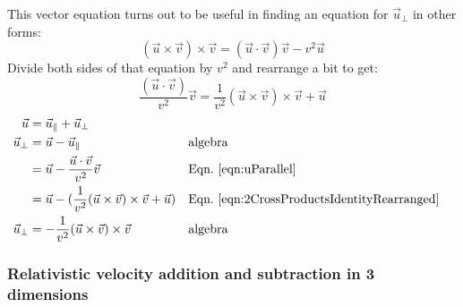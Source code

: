 \documentclass[a4paper]{article}
\theoremstyle{plain}
\theoremstyle{definition}
\newcommand{\vect}[1]{\vec{#1}}
\begin{document}
This vector equation turns out to be useful in finding an equation for
$\vect{u}_{\perp}$ in other forms:
\begin{equation}
(\vect{u} \times \vect{v}) \times \vect{v} = (\vect{u} \cdot \vect{v}) \vect{v} - v^2 \vect{u} \label{eqn:2CrossProductsIdentity}
\end{equation}
Divide both sides of that equation by $v^2$ and rearrange a bit to get:
\begin{equation}
\frac{(\vect{u} \cdot \vect{v})}{v^2} \vect{v} = \frac{1}{v^2} (\vect{u} \times \vect{v}) \times \vect{v} + \vect{u} \label{eqn:2CrossProductsIdentityRearranged}
\end{equation}
\begin{align}
\vect{u} & = \vect{u}_{\parallel} + \vect{u}_{\perp} \nonumber \\
\vect{u}_{\perp}
  & = \vect{u} - \vect{u}_{\parallel} & & \text{algebra} \nonumber \\
  & = \vect{u} - \frac{\vect{u} \cdot \vect{v}}{v^2} \vect{v} & & \text{Eqn.~\eqref{eqn:uParallel}} \nonumber \\
  & = \vect{u} - (\frac{1}{v^2} (\vect{u} \times \vect{v}) \times \vect{v} + \vect{u}) & & \text{Eqn.~\eqref{eqn:2CrossProductsIdentityRearranged}} \nonumber \\\vect{u}_{\perp}
  & = - \frac{1}{v^2} (\vect{u} \times \vect{v}) \times \vect{v} & & \text{algebra} \label{eqn:uPerpendicular}
\end{align}


\subsubsection{Relativistic velocity addition and subtraction in 3 dimensions}
\label{app:3drelvelocityadd}
\end{document}
